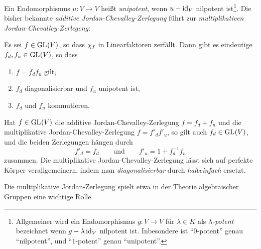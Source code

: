 Ein Endomorphismus $u \colon V \to V$ heißt \emph{unipotent}, wenn $u - \operatorname{id}_V$ nilpotent ist\footnote{
Allgemeiner wird ein Endomorphismus $g \colon V \to V$ für $\lambda \in K$ als \emph{$\lambda$-potent} bezeichnet wenn $g - \lambda \operatorname{id}_V$ nilpotent ist.
Inbesondere ist \enquote{$0$-potent} genau \enquote{nilpotent}, und \enquote{$1$-potent} genau \enquote{unipotent}.}.
Die bisher bekannte \emph{additive Jordan-Chevalley-Zerlegung} führt zur \emph{multiplikativen Jordan-Chevalley-Zerlegeng}:

\begin{theorem}
  Es sei $f \in \operatorname{GL}_{}(V)$, so dass $\chi_{f}$ in Linearfaktoren zerfällt.
  Dann gibt es eindeutige $f_d, f_u \in \operatorname{GL}_{}(V)$, so dass
  \begin{enumerate}
    \item
      $f = f_d f_u$ gilt,
    \item
      $f_d$ diagonalisierbar und $f_u$ unipotent ist,
    \item
      $f_d$ und $f_u$ kommutieren.
  \end{enumerate}
\end{theorem}

Hat $f \in \operatorname{GL}_{}(V)$ die additive Jordan-Chevalley-Zerlegung $f = f_d + f_n$ und die multiplikative Jordan-Chevalley-Zerlegung $f = f'_d f'_u$, so gilt auch $f_d \in \operatorname{GL}_{}(V)$, und die beiden Zerlegungen hängen durch
\[
  f'_d = f_d
  \qquad\text{und}\qquad
  f'_u = 1 + f_d^{-1} f_n
\]
zusammen.
Die multiplikative Jordan-Chevalley-Zerlegung lässt sich auf perfekte Körper verallgemeinern, indem man \emph{diagonalisierbar} durch \emph{halbeinfach} ersetzt.

Die multiplikative Jordan-Zerlegung spielt etwa in der Theorie algebraischer Gruppen eine wichtige Rolle.




